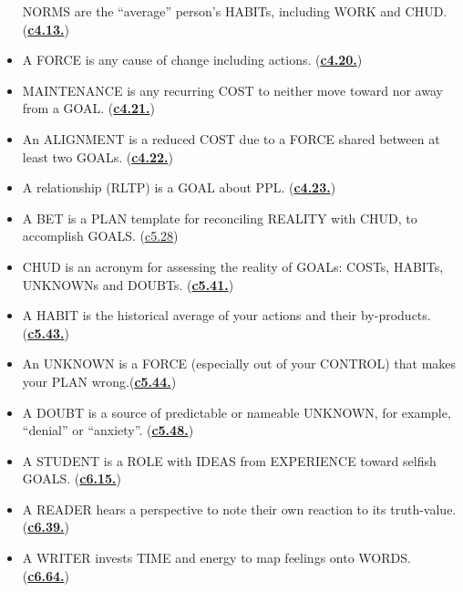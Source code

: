 \documentclass[
]{book}
\begin{document}
\begin{itemize}
  NORMS are the ``average'' person's HABITs, including WORK and CHUD. (\protect\hyperlink{work}{\textbf{c4.13.}})\\
\item
  A FORCE is any cause of change including actions. (\protect\hyperlink{work}{\textbf{c4.20.}})\\
\item
  MAINTENANCE is any recurring COST to neither move toward nor away from a GOAL. (\protect\hyperlink{work}{\textbf{c4.21.}})\\
\item
  An ALIGNMENT is a reduced COST due to a FORCE shared between at least two GOALs. (\protect\hyperlink{work}{\textbf{c4.22.}})\\
\item
  A relationship (RLTP) is a GOAL about PPL. (\protect\hyperlink{work}{\textbf{c4.23.}})\\
\item
  A BET is a PLAN template for reconciling REALITY with CHUD, to accomplish GOALS. (\protect\hyperlink{bet}{c5.28})\\
\item
  CHUD is an acronym for assessing the reality of GOALs: COSTs, HABITs, UNKNOWNs and DOUBTs. (\protect\hyperlink{c.h.u.d.}{\textbf{c5.41.}})\\
\item
  A HABIT is the historical average of your actions and their by-products.(\protect\hyperlink{costs-and-habits}{\textbf{c5.43.}})\\
\item
  An UNKNOWN is a FORCE (especially out of your CONTROL) that makes your PLAN wrong.(\protect\hyperlink{unknowns-and-doubts}{\textbf{c5.44.}})\\
\item
  A DOUBT is a source of predictable or nameable UNKNOWN, for example, ``denial'' or ``anxiety''. (\protect\hyperlink{unknowns-and-doubts}{\textbf{c5.48.}})\\
\item
  A STUDENT is a ROLE with IDEAS from EXPERIENCE toward selfish GOALS. (\protect\hyperlink{student}{\textbf{c6.15.}})\\
\item
  A READER hears a perspective to note their own reaction to its truth-value. (\protect\hyperlink{read}{\textbf{c6.39.}})\\
\item
  A WRITER invests TIME and energy to map feelings onto WORDS. (\protect\hyperlink{write-plan-1}{\textbf{c6.64.}})\\

\end{itemize}
\end{document}
